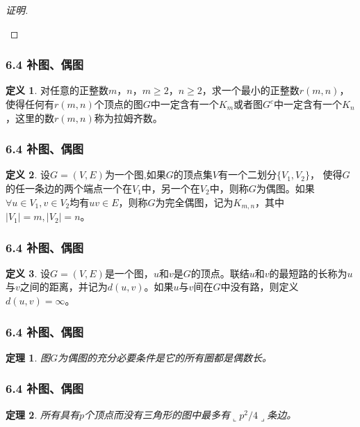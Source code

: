 \documentclass{beamer}
\newtheorem{Thm}{定理}[section]
\theoremstyle{definition}
\newtheorem{Def}{定义}[section]
\theoremstyle{example}
\begin{document}
\begin{CJK*}{UTF8}{gbsn}
\begin{frame}
\begin{proof}[证明]
\begin{itemize}
    \end{itemize}
  \end{proof}
\end{frame}

\begin{frame}
  \frametitle{6.4 补图、偶图}
  \begin{Def}
    对任意的正整数$m$，$n$，$m \geq 2$，$n \geq 2$，求一个最小的正整数$r(m,n)$，
    使得任何有$r(m,n)$个顶点的图$G$中一定含有一个$K_m$或者图$G^c$中一定含有一个$K_n$，这里的数$r(m,n)$称为\alert{拉姆齐数}。
  \end{Def}
\end{frame}

\begin{frame}
  \frametitle{6.4 补图、偶图}
  \begin{Def}\justifying\let\raggedright\justifying
    设$G=(V,E)$为一个图,如果$G$的顶点集$V$有一个二划分$\{V_1,V_2\}$，
    使得$G$的任一条边的两个端点一个在$V_1$中，另一个在$V_2$中，则称$G$为\alert{偶图}。如果$\forall u \in V_1, v \in V_2$均有$uv \in E$，则称$G$为\alert{完全偶图}，记为$K_{m,n}$，其中$|V_1|=m,|V_2|=n$。
  \end{Def}
\end{frame}

\begin{frame}
  \frametitle{6.4 补图、偶图}
  \begin{Def}
    设$G=(V,E)$是一个图，$u$和$v$是$G$的顶点。联结$u$和$v$的最短路的长称为$u$与$v$之间的\alert{距离}，并记为$d(u,v)$。如果$u$与$v$间在$G$中没有路，则定义$d(u,v)=\infty$。
  \end{Def}
\end{frame}

\begin{frame}
  \frametitle{6.4 补图、偶图}
  \begin{Thm}
    图$G$为偶图的充分必要条件是它的所有圈都是偶数长。
  \end{Thm}
\end{frame}

\begin{frame}
  \frametitle{6.4 补图、偶图}
  \begin{Thm}
    所有具有$p$个顶点而没有三角形的图中最多有$\llcorner p^2/4\lrcorner$条边。
  \end{Thm}
\end{frame}


\end{CJK*}
\end{document}
